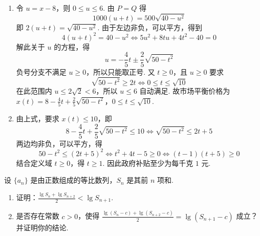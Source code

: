 \documentclass[UTF8,a4paper,oneside,11pt]{ctexbook}
\begin{document}
\begin{solution}
\begin{enumerate}
\item 令 \(u=x-8\)，则 \(0\leqslant u\leqslant6\). 由 \(P=Q\) 得
\[
1000(u+t)=500\sqrt{40-u^2}
\]
即 \(2(u+t)=\sqrt{40-u^2}\). 由于左边非负，可以平方，得到
\[
4(u+t)^2=40-u^2
\Longleftrightarrow 5u^2+8tu+4t^2-40=0
\]
解此关于 \(u\) 的方程，得
\[
u=-\frac45t\pm\frac25\sqrt{50-t^2}
\]
负号分支不满足 \(u\geqslant0\)，所以只能取正号. 又 \(t\geqslant0\)，且 \(u\geqslant0\) 要求
\[
\sqrt{50-t^2}\geqslant2t\Longleftrightarrow 0\leqslant t\leqslant\sqrt{10}
\]
在此范围内 \(u\leqslant2\sqrt2<6\)，所以 \(u\leqslant6\) 自动满足. 故市场平衡价格为
\(x(t)=8-\frac45t+\frac25\sqrt{50-t^2}\)，\(0\leqslant t\leqslant\sqrt{10}\).

\item 由上式，要求 \(x(t)\leqslant10\)，即
\[
8-\frac45t+\frac25\sqrt{50-t^2}\leqslant10
\Longleftrightarrow \sqrt{50-t^2}\leqslant2t+5
\]
两边均非负，可以平方，得
\[
50-t^2\leqslant(2t+5)^2
\Longleftrightarrow t^2+4t-5\geqslant0
\Longleftrightarrow (t-1)(t+5)\geqslant0
\]
结合定义域 \(t\geqslant0\)，得 \(t\geqslant1\). 因此政府补贴至少为每千克 \(1\) 元.
\end{enumerate}
\end{solution}

\begin{problem}
设 \(\{a_{n}\}\) 是由正数组成的等比数列，\(S_{n}\) 是其前 \(n\) 项和.

\begin{enumerate}
\item 证明：\(\frac{\lg S_n + \lg S_{n + 2}}{2} < \lg S_{n + 1}\).

\item 是否存在常数 \(c > 0\)，使得 \(\frac{\lg (S_n - c) + \lg (S_{n+2} - c)}{2} = \lg (S_{n+1} - c)\) 成立？并证明你的结论.
\end{enumerate}
\end{problem}
\end{document}
